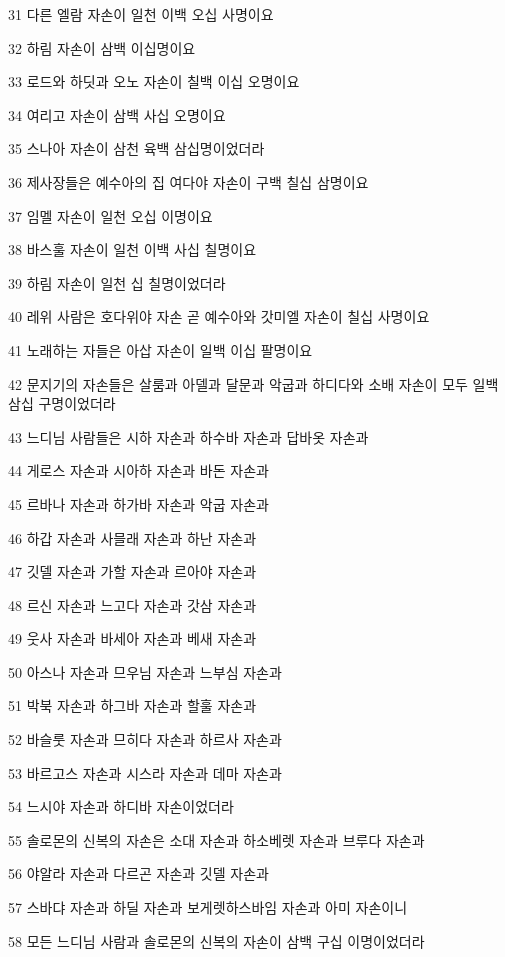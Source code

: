 \par 31 다른 엘람 자손이 일천 이백 오십 사명이요
\par 32 하림 자손이 삼백 이십명이요
\par 33 로드와 하딧과 오노 자손이 칠백 이십 오명이요
\par 34 여리고 자손이 삼백 사십 오명이요
\par 35 스나아 자손이 삼천 육백 삼십명이었더라
\par 36 제사장들은 예수아의 집 여다야 자손이 구백 칠십 삼명이요
\par 37 임멜 자손이 일천 오십 이명이요
\par 38 바스훌 자손이 일천 이백 사십 칠명이요
\par 39 하림 자손이 일천 십 칠명이었더라
\par 40 레위 사람은 호다위야 자손 곧 예수아와 갓미엘 자손이 칠십 사명이요
\par 41 노래하는 자들은 아삽 자손이 일백 이십 팔명이요
\par 42 문지기의 자손들은 살룸과 아델과 달문과 악굽과 하디다와 소배 자손이 모두 일백 삼십 구명이었더라
\par 43 느디님 사람들은 시하 자손과 하수바 자손과 답바옷 자손과
\par 44 게로스 자손과 시아하 자손과 바돈 자손과
\par 45 르바나 자손과 하가바 자손과 악굽 자손과
\par 46 하갑 자손과 사믈래 자손과 하난 자손과
\par 47 깃델 자손과 가할 자손과 르아야 자손과
\par 48 르신 자손과 느고다 자손과 갓삼 자손과
\par 49 웃사 자손과 바세아 자손과 베새 자손과
\par 50 아스나 자손과 므우님 자손과 느부심 자손과
\par 51 박북 자손과 하그바 자손과 할훌 자손과
\par 52 바슬룻 자손과 므히다 자손과 하르사 자손과
\par 53 바르고스 자손과 시스라 자손과 데마 자손과
\par 54 느시야 자손과 하디바 자손이었더라
\par 55 솔로몬의 신복의 자손은 소대 자손과 하소베렛 자손과 브루다 자손과
\par 56 야알라 자손과 다르곤 자손과 깃델 자손과
\par 57 스바댜 자손과 하딜 자손과 보게렛하스바임 자손과 아미 자손이니
\par 58 모든 느디님 사람과 솔로몬의 신복의 자손이 삼백 구십 이명이었더라
